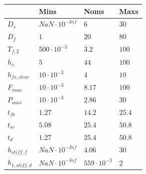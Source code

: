 \begin{tabular}{llll}
& Mins & Noms & Maxs\\ 
\hline 
$D_s$ & $NaN \cdot 10^{-Inf}$ & $6 $ & $30 $ \\ 
$D_f$ & $1 $ & $20 $ & $80 $ \\ 
$T_{f,2}$ & $500 \cdot 10^{-3}$ & $3.2 $ & $100 $ \\ 
$h_s$ & $5 $ & $44 $ & $100 $ \\ 
$h_{fs,clear}$ & $10 \cdot 10^{-3}$ & $4 $ & $10 $ \\ 
$F_{max}$ & $10 \cdot 10^{-3}$ & $8.17 $ & $100 $ \\ 
$P_{max}$ & $10 \cdot 10^{-3}$ & $2.86 $ & $30 $ \\ 
$t_{fb}$ & $1.27 $ & $14.2 $ & $25.4 $ \\ 
$t_{sr}$ & $5.08 $ & $25.4 $ & $50.8 $ \\ 
$t_d$ & $1.27 $ & $25.4 $ & $50.8 $ \\ 
$h_{stiff,f}$ & $NaN \cdot 10^{-Inf}$ & $4.06 $ & $30 $ \\ 
$h_{1,stiff,d}$ & $NaN \cdot 10^{-Inf}$ & $559 \cdot 10^{-3}$ & $2 $ \\ 
\end{tabular}